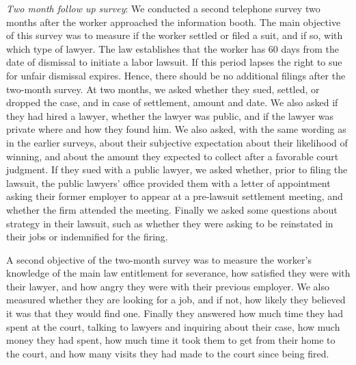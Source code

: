 \documentclass[oneside,12pt]{article}
\begin{document}
\emph{Two month follow up survey}: We conducted a second telephone survey two months after the worker approached the information booth. The main objective of this survey was to measure if the worker settled or filed a suit, and if so, with which type of lawyer. The law establishes that the worker has 60 days from the date of dismissal to initiate a labor lawsuit. If this period lapses the right to sue for unfair dismissal expires. Hence, there should be no additional filings after the two-month survey. At two months, we asked whether they sued, settled, or dropped the case, and in case of settlement, amount and date. We also asked if they had hired a lawyer, whether the lawyer was public, and if the lawyer was private where and how they found him. We also asked, with the same wording as in the earlier surveys, about their subjective expectation about their likelihood of winning, and about the amount they expected to collect after a favorable court judgment. If they sued with a public lawyer, we asked whether, prior to filing the lawsuit, the public lawyers’ office provided them with a letter of appointment asking their former employer to appear at a pre-lawsuit settlement meeting, and whether the firm attended the meeting. Finally we asked some questions about strategy in their lawsuit, such as whether they were asking to be reinstated in their jobs or indemnified for the firing.

A second objective of the two-month survey was to measure the worker’s knowledge of the main law entitlement for severance, how satisfied they were with their lawyer, and how angry they were with their previous employer. We also measured whether they are looking for a job, and if not, how likely they believed it was that they would find one. Finally they answered how much time they had spent at the court, talking to lawyers and inquiring about their case, how much money they had spent, how much time it took them to get from their home to the court, and how many visits they had made to the court since being fired.
\end{document}
